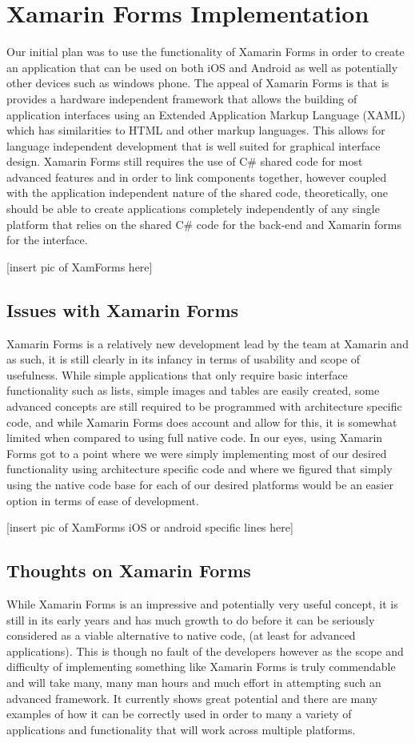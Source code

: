 \documentclass[main.tex]{subfiles}
\begin{document}
\section{Xamarin Forms Implementation}

Our initial plan was to use the functionality of Xamarin Forms in order to create an application that can be used on both iOS and Android as well as potentially other devices such as windows phone. The appeal of Xamarin Forms is that is provides a hardware independent framework that allows the building of application interfaces using an Extended Application Markup Language (XAML) which has similarities to HTML and other markup languages. This allows for language independent development that is well suited for graphical interface design. Xamarin Forms still requires the use of C\# shared code for most advanced features and in order to link components together, however coupled with the application independent nature of the shared code, theoretically, one should be able to create applications completely independently of any single platform that relies on the shared C\# code for the back-end and Xamarin forms for the interface.

[insert pic of XamForms here]

\subsection{Issues with Xamarin Forms}

Xamarin Forms is a relatively new development lead by the team at Xamarin and as such, it is still clearly in its infancy in terms of usability and scope of usefulness. While simple applications that only require basic interface functionality such as lists, simple images and tables are easily created, some advanced concepts are still required to be programmed with architecture specific code, and while Xamarin Forms does account and allow for this, it is somewhat limited when compared to using full native code. In our eyes, using Xamarin Forms got to a point where we were simply implementing most of our desired functionality using architecture specific code and where we figured that simply using the native code base for each of our desired platforms would be an easier option in terms of ease of development.

[insert pic of XamForms iOS or android specific lines here]

\subsection{Thoughts on Xamarin Forms}
While Xamarin Forms is an impressive and potentially very useful concept, it is still in its early years and has much growth to do before it can be seriously considered as a viable alternative to native code, (at least for advanced applications). This is though no fault of the developers however as the scope and difficulty of implementing something like Xamarin Forms is truly commendable and will take many, many man hours and much effort in attempting such an advanced framework. It currently shows great potential and there are many examples of how it can be correctly used in order to many a variety of applications and functionality that will work across multiple platforms.
\end{document}
